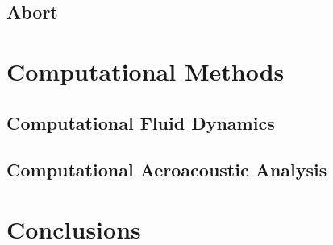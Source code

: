 \documentclass[]{aiaa-tc}%
\begin{document}
\subsection{Abort}






\section{Computational Methods}


\subsection{Computational Fluid Dynamics}


\subsection{Computational Aeroacoustic Analysis}






\section{Conclusions}
\end{document}
